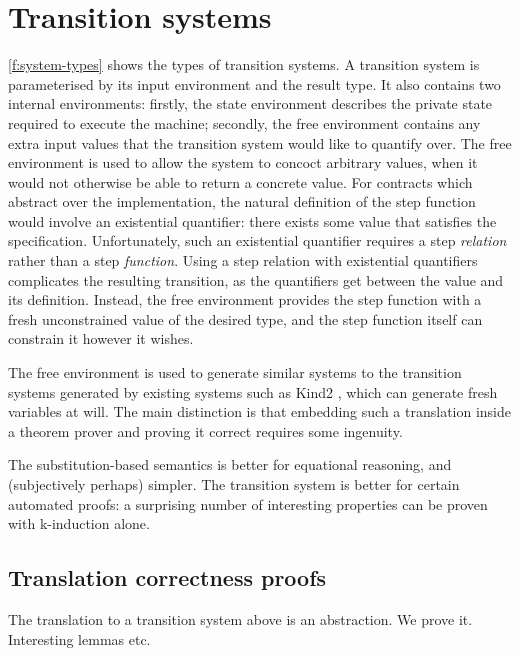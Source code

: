 
\section{Transition systems}
\label{s:transition}


\autoref{f:system-types} shows the types of transition systems.
A transition system is parameterised by its input environment and the result type.
It also contains two internal environments: firstly, the state environment describes the private state required to execute the machine; secondly, the free environment contains any extra input values that the transition system would like to quantify over.
The free environment is used to allow the system to concoct arbitrary values, when it would not otherwise be able to return a concrete value.
For contracts which abstract over the implementation, the natural definition of the step function would involve an existential quantifier: there exists some value that satisfies the specification.
Unfortunately, such an existential quantifier requires a step \emph{relation} rather than a step \emph{function}.
Using a step relation with existential quantifiers complicates the resulting transition, as the quantifiers get between the value and its definition.
Instead, the free environment provides the step function with a fresh unconstrained value of the desired type, and the step function itself can constrain it however it wishes.

The free environment is used to generate similar systems to the transition systems generated by existing systems such as Kind2 \cite{champion2016kind2}, which can generate fresh variables at will.
The main distinction is that embedding such a translation inside a theorem prover and proving it correct requires some ingenuity.



The substitution-based semantics is better for equational reasoning, and (subjectively perhaps) simpler.
The transition system is better for certain automated proofs: a surprising number of interesting properties can be proven with k-induction alone.

\subsection{Translation correctness proofs}
\label{s:transition:proof}

The translation to a transition system above is an abstraction.
We prove it.
Interesting lemmas etc.

